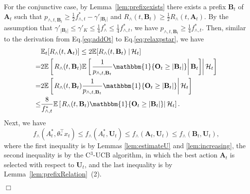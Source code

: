 \documentclass{article}
\newcommand{\EE}{\mathbb{E}}
\newcommand{\bOne}{\mathbbm{1}}
\newcommand{\bA}{\mathbf{A}}
\newcommand{\bB}{\mathbf{B}}
\newcommand{\bO}{\mathbf{O}}
\newcommand{\bU}{\mathbf{U}}
\newcommand{\cH}{\mathcal{H}}
\newcommand{\abs}[1]{\left| #1 \right|}
\newenvironment{proof}{\noindent {\textbf{Proof. }}}{$\Box$ \medskip}
\begin{document}
\begin{proof}
  For the conjunctive case, by Lemma~\ref{lem:prefixexists} there exists a prefix $\bB_t$ of $\bA_t$ such that $p_{\wedge, t, \bB_t} \geq \frac{1}{2}f_{\wedge, t}^* - \gamma'_{|\bB_t|}$ and $R_{\wedge}(t, \bB_t) \geq \frac{1}{2} R_{\wedge}(t, \bA_t)$. 
  By the assumption that $\gamma'_{|\bB_t|}\le \gamma'_K \le \frac{1}{4} f^*_{\wedge} \le \frac{1}{4} f^*_{\wedge,t}  $, we have $p_{\wedge, t, \bB_t} \geq \frac{1}{4}f_{\wedge, t}^*$. 
  Then, similar to the derivation from Eq.\eqref{eq:addOt} to Eq.\eqref{eq:relaxpstar}, we have
  \begin{align}
    &\EE_t[R_{\wedge}(t, \bA_t)] \leq 2 \EE[R_{\wedge}(t, \bB_t) \left. \right| \cH_t] \nonumber \\
    =& 2 \EE \left[ \left. R_{\wedge}(t, \bB_t) \EE \left[ \left. \frac{1}{p_{\wedge, t, \bB_t}} \bOne\{\bO_t\geq\abs{\bB_t}\} \right| \bB_t \right]  \right| \cH_t \right] \nonumber \\
    =& 2\EE \left[ \left. R_{\wedge}(t, \bB_t) \frac{1}{p_{\wedge, t, \bB_t}} \bOne\{\bO_t\geq\abs{\bB_t}\}  \right| \cH_t \right] \nonumber \\
    \leq &\frac{8}{f_{\wedge, t}^{\ast}} \EE \left[ \left. R_{\wedge}(t, \bB_t) \bOne\{\bO_t\geq\abs{\bB_t}\}  \right| \cH_t \right]. \label{eq:btOneotbt}
  \end{align}
  Next, we have
  \begin{equation} \label{eq:andstarbt}
    f_{\wedge}(A_t^*, \theta_*^{\top}x_t) \leq f_{\wedge}(A_t^*,\bU_t) \leq f_{\wedge}(\bA_t,\bU_t) \leq f_{\wedge}(\bB_t,\bU_t),
  \end{equation}
  where the first inequality is by Lemmas \ref{lem:estimateU} and \ref{lem:increasing}, the second inequality is by the C$^3$-UCB algorithm, in which the best action $\bA_t$ is selected with respect to $\bU_t$, and the last inequality is by Lemma~\ref{lem:prefixRelation}~(2).
  

\end{proof}
\end{document}
